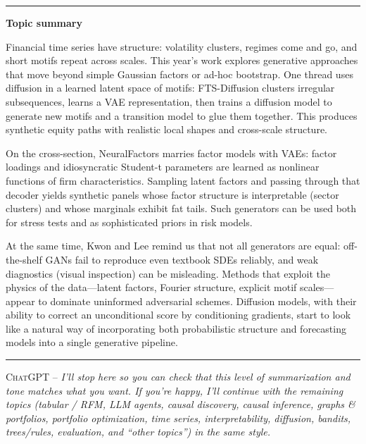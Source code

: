 \documentclass[a5paper]{article}
\def\subsection#1{{\par\bigskip\goodbreak\large\bfseries #1\par}}
\begin{document}
\begin{center}\rule{0.5\linewidth}{0.5pt}\end{center}

\subsection{Topic summary}\label{topic-summary-1}

Financial time series have structure: volatility clusters, regimes come
and go, and short motifs repeat across scales. This year's work explores
generative approaches that move beyond simple Gaussian factors or ad-hoc
bootstrap. One thread uses diffusion in a learned latent space of
motifs: FTS-Diffusion clusters irregular subsequences, learns a VAE
representation, then trains a diffusion model to generate new motifs and
a transition model to glue them together. This produces synthetic equity
paths with realistic local shapes and cross-scale structure.

On the cross-section, NeuralFactors marries factor models with VAEs:
factor loadings and idiosyncratic Student-t parameters are learned as
nonlinear functions of firm characteristics. Sampling latent factors and
passing through that decoder yields synthetic panels whose factor
structure is interpretable (sector clusters) and whose marginals exhibit
fat tails. Such generators can be used both for stress tests and as
sophisticated priors in risk models.

At the same time, Kwon and Lee remind us that not all generators are
equal: off-the-shelf GANs fail to reproduce even textbook SDEs reliably,
and weak diagnostics (visual inspection) can be misleading. Methods that
exploit the physics of the data---latent factors, Fourier structure,
explicit motif scales---appear to dominate uninformed adversarial
schemes. Diffusion models, with their ability to correct an
unconditional score by conditioning gradients, start to look like a
natural way of incorporating both probabilistic structure and
forecasting models into a single generative pipeline.

\begin{center}\rule{0.5\linewidth}{0.5pt}\end{center}

\textsc{ChatGPT --}
\itshape
I'll stop here so you can check that this level of summarization and
tone matches what you want. If you're happy, I'll continue with the
remaining topics (tabular / RFM, LLM agents, causal discovery, causal
inference, graphs \& portfolios, portfolio optimization, time series,
interpretability, diffusion, bandits, trees/rules, evaluation, and
``other topics'') in the same style.
\end{document}
